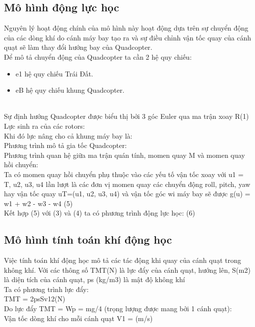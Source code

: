         \subsection{Mô hình động lực học}
        Nguyên lý hoạt động chính của mô hình này hoạt động dựa trên sự chuyển động của các dòng khí do cánh máy bay tạo ra và sự điều chỉnh vận tốc quay của cánh quạt sẽ làm thay đổi hướng bay của Quadcopter.\\
        Để mô tả chuyển động của Quadcopter ta cần 2 hệ quy chiếu:
        \begin{itemize}
        \item e1 hệ quy chiếu Trái Đất.
        \item eB hệ quy chiếu khung Quadcopter.
        \end{itemize}
        \\
        Sự định hướng Quadcopter được biểu thị bởi 3 góc Euler qua ma trận xoay R(1)
        \\
        Lực sinh ra của các rotors:
        \\
        Khi đó lực nâng cho cả khung máy bay là:
        \\
        Phương trình mô tả gia tốc Quadcopter:
        \\
        Phương trình quan hệ giữa ma trận quán tính, momen quay M và momen quay hồi chuyển:
        \\
        Ta có momen quay hồi chuyển phụ thuộc vào các yếu tố vận tốc xoay với u1 = T, u2, u3, u4 lần lượt là các đơn vị momen quay các chuyển động roll, pitch, yaw hay vận tốc quay uT=(u1, u2, u3, u4) và vận tốc góc wi máy bay sẽ được g(u) = w1 + w2 - w3 - w4 (5)
        \\
        Kết hợp (5) với (3) và (4) ta có phương trình động lực học: (6) 
        \subsection{Mô hình tính toán khí động học}
        Việc tính toán khí động học mô tả các tác động khi quay của cánh quạt trong không khí. Với các thông số TMT(N) là lực đẩy của cánh quạt, hướng lên, S(m2) là diện tích của cánh quạt, ps (kg/m3) là mật độ không khí
        \\
        Ta có phương trình lực đẩy:
        \\
        TMT = 2psSv12(N)
        \\
        Do lực đẩy TMT = Wp = mg/4 (trọng lượng được mang bởi 1 cánh quạt):
        \\
        Vận tốc dòng khí cho mỗi cánh quạt V1 =  (m/s) 
